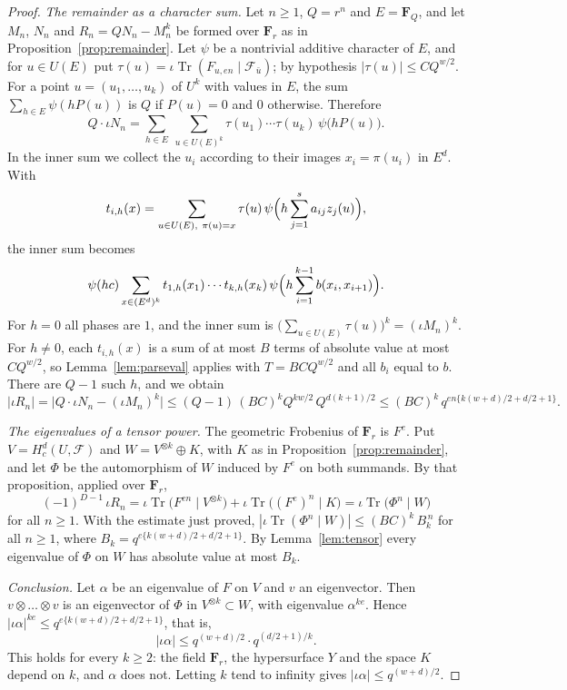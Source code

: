 \documentclass[11pt,a4paper]{article}
\theoremstyle{plain}
\theoremstyle{remark}
\newcommand{\F}{\mathcal F}
\newcommand{\Tr}{\operatorname{Tr}}
\begin{document}
\begin{proof}
\emph{The remainder as a character sum.} Let $n\ge1$, $Q=r^n$ and $E=\mathbf F_Q$, and let $M_n$, $N_n$ and
$R_n=QN_n-M_n^k$ be formed over $\mathbf F_r$ as in Proposition~\ref{prop:remainder}. Let $\psi$ be a nontrivial
additive character of $E$, and for $u\in U(E)$ put $\tau(u)=\iota\Tr(F_{u,en}\mid\F_{\bar u})$; by hypothesis
$|\tau(u)|\le CQ^{w/2}$. For a point $u=(u_1,\dots,u_k)$ of $U^k$ with values in $E$, the sum
$\sum_{h\in E}\psi(hP(u))$ is $Q$ if $P(u)=0$ and $0$ otherwise. Therefore
\[
Q\cdot\iota N_n=\sum_{h\in E}\ \sum_{u\in U(E)^k}\tau(u_1)\cdots\tau(u_k)\,\psi\bigl(hP(u)\bigr).
\]
In the inner sum we collect the $u_i$ according to their images $x_i=\pi(u_i)$ in $E^d$. With
\[
t_{i,h}(x)=\sum_{u\in U(E),\ \pi(u)=x}\tau(u)\,\psi\Bigl(h\sum_{j=1}^sa_{ij}z_j(u)\Bigr),
\]
the inner sum becomes
\[
\psi(hc)\sum_{x\in(E^d)^k}t_{1,h}(x_1)\cdots t_{k,h}(x_k)\,\psi\Bigl(h\sum_{i=1}^{k-1}b(x_i,x_{i+1})\Bigr).
\]
For $h=0$ all phases are $1$, and the inner sum is $\bigl(\sum_{u\in U(E)}\tau(u)\bigr)^k=(\iota M_n)^k$. For
$h\ne0$, each $t_{i,h}(x)$ is a sum of at most $B$ terms of absolute value at most $CQ^{w/2}$, so
Lemma~\ref{lem:parseval} applies with $T=BCQ^{w/2}$ and all $b_i$ equal to $b$. There are $Q-1$ such $h$, and we
obtain
\[
|\iota R_n|=\bigl|Q\cdot\iota N_n-(\iota M_n)^k\bigr|\le(Q-1)\,(BC)^kQ^{kw/2}\,Q^{d(k+1)/2}
\le(BC)^k\,q^{en\{k(w+d)/2+d/2+1\}}.
\]

\emph{The eigenvalues of a tensor power.} The geometric Frobenius of $\mathbf F_r$ is $F^e$. Put
$V=H^d_c(U,\F)$ and $W=V^{\otimes k}\oplus K$, with $K$ as in Proposition~\ref{prop:remainder}, and let $\Phi$ be
the automorphism of $W$ induced by $F^e$ on both summands. By that proposition, applied over $\mathbf F_r$,
\[
(-1)^{D-1}\,\iota R_n=\iota\Tr\bigl(F^{en}\mid V^{\otimes k}\bigr)+\iota\Tr\bigl((F^e)^n\mid K\bigr)
=\iota\Tr\bigl(\Phi^n\mid W\bigr)
\]
for all $n\ge1$. With the estimate just proved, $|\iota\Tr(\Phi^n\mid W)|\le(BC)^k\,B_k^{\,n}$ for all $n\ge1$,
where $B_k=q^{e\{k(w+d)/2+d/2+1\}}$. By Lemma~\ref{lem:tensor} every eigenvalue of $\Phi$ on $W$ has absolute value
at most $B_k$.

\emph{Conclusion.} Let $\alpha$ be an eigenvalue of $F$ on $V$ and $v$ an eigenvector. Then $v\otimes\dots\otimes v$
is an eigenvector of $\Phi$ in $V^{\otimes k}\subset W$, with eigenvalue $\alpha^{ke}$. Hence
$|\iota\alpha|^{ke}\le q^{e\{k(w+d)/2+d/2+1\}}$, that is,
\[
|\iota\alpha|\le q^{(w+d)/2}\cdot q^{(d/2+1)/k}.
\]
This holds for every $k\ge2$: the field $\mathbf F_r$, the hypersurface $Y$ and the space $K$ depend on $k$, and
$\alpha$ does not. Letting $k$ tend to infinity gives $|\iota\alpha|\le q^{(w+d)/2}$.
\end{proof}
\end{document}
